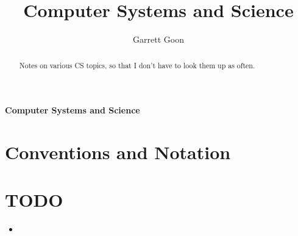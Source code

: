 \documentclass[11pt]{article}
\title{Computer Systems and Science}
\author{Garrett Goon}
\begin{document}
%

\vspace{1truecm}
%
%
\renewcommand{\thefootnote}{\fnsymbol{footnote}}
\begin{center}
{\huge \bf{Computer Systems and Science}}
\end{center}


\begin{abstract}

Notes on various CS topics, so that I don't have to look them up as often.

\end{abstract}

\tableofcontents


\renewcommand*{\thefootnote}{\arabic{footnote}}
\setcounter{footnote}{0}



\appendix


\section{Conventions and Notation}\label{app_conventions}



 \section{TODO}


 \begin{itemize}
 \item
 \end{itemize}



\end{document}
